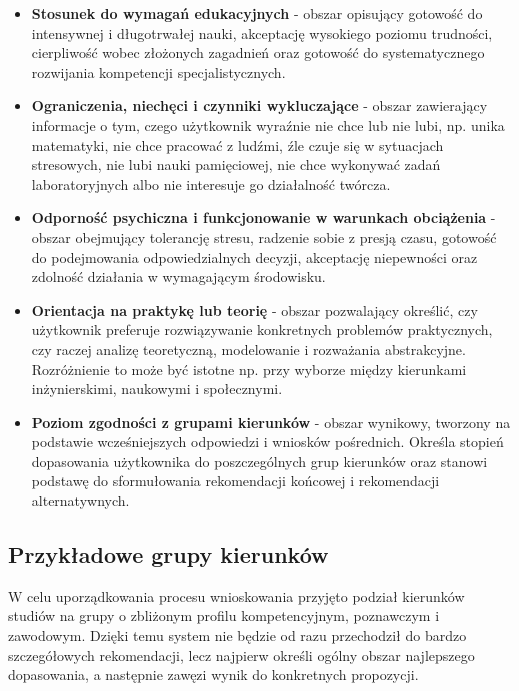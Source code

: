 \documentclass[12pt,a4paper,oneside]{article}
\begin{document}
\begin{itemize}[leftmargin=1.2cm]
    \item \textbf{Stosunek do wymagań edukacyjnych} - obszar opisujący gotowość do intensywnej i długotrwałej nauki, akceptację wysokiego poziomu trudności, cierpliwość wobec złożonych zagadnień oraz gotowość do systematycznego rozwijania kompetencji specjalistycznych.

    \item \textbf{Ograniczenia, niechęci i czynniki wykluczające} - obszar zawierający informacje o tym, czego użytkownik wyraźnie nie chce lub nie lubi, np. unika matematyki, nie chce pracować z ludźmi, źle czuje się w sytuacjach stresowych, nie lubi nauki pamięciowej, nie chce wykonywać zadań laboratoryjnych albo nie interesuje go działalność twórcza.

    \item \textbf{Odporność psychiczna i funkcjonowanie w warunkach obciążenia} - obszar obejmujący tolerancję stresu, radzenie sobie z presją czasu, gotowość do podejmowania odpowiedzialnych decyzji, akceptację niepewności oraz zdolność działania w wymagającym środowisku.

    \item \textbf{Orientacja na praktykę lub teorię} - obszar pozwalający określić, czy użytkownik preferuje rozwiązywanie konkretnych problemów praktycznych, czy raczej analizę teoretyczną, modelowanie i rozważania abstrakcyjne. Rozróżnienie to może być istotne np. przy wyborze między kierunkami inżynierskimi, naukowymi i społecznymi.

    \item \textbf{Poziom zgodności z grupami kierunków} - obszar wynikowy, tworzony na podstawie wcześniejszych odpowiedzi i wniosków pośrednich. Określa stopień dopasowania użytkownika do poszczególnych grup kierunków oraz stanowi podstawę do sformułowania rekomendacji końcowej i rekomendacji alternatywnych.
\end{itemize}

\subsection{Przykładowe grupy kierunków}

W celu uporządkowania procesu wnioskowania przyjęto podział kierunków studiów na grupy o zbliżonym profilu kompetencyjnym, poznawczym i zawodowym. Dzięki temu system nie będzie od razu przechodził do bardzo szczegółowych rekomendacji, lecz najpierw określi ogólny obszar najlepszego dopasowania, a następnie zawęzi wynik do konkretnych propozycji.
\end{document}
